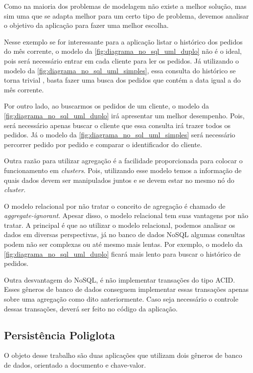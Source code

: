 Como na maioria dos problemas de modelagem não existe a melhor solução, mas sim uma que se adapta melhor para um certo tipo de problema, devemos analisar o objetivo da aplicação para fazer uma melhor escolha.

Nesse exemplo se for interessante para a aplicação listar o histórico dos pedidos do mês corrente, o modelo da \autoref{fig:diagrama_no_sql_uml_duplo} não é o ideal, pois será necessário entrar em cada cliente para ler os pedidos. Já utilizando o modelo da \autoref{fig:diagrama_no_sql_uml_simples}, essa consulta do histórico se torna trivial \cite{NoSQL}, basta fazer uma busca dos pedidos que contém a data igual a do mês corrente.

Por outro lado, ao buscarmos os pedidos de um cliente, o modelo da \autoref{fig:diagrama_no_sql_uml_duplo} irá apresentar um melhor desempenho. Pois, será necessário apenas buscar o cliente que essa consulta irá trazer todos os pedidos. Já o modelo da \autoref{fig:diagrama_no_sql_uml_simples} será necessário percorrer pedido por pedido e comparar o identificador do cliente.

Outra razão para utilizar agregação é a facilidade proporcionada para colocar o funcionamento em \textit{clusters}. Pois, utilizando esse modelo temos a informação de quais dados devem ser manipulados juntos e se devem estar no mesmo nó do \textit{cluster}.

O modelo relacional por não tratar o conceito de agregação é chamado de \textit{aggregate-ignorant}. Apesar disso, o modelo relacional tem suas vantagens por não tratar. A principal é que ao utilizar o modelo relacional, podemos analisar os dados em diversas perspectivas, já no banco de dados NoSQL algumas consultas podem não ser complexas ou até mesmo mais lentas. Por exemplo, o modelo da \autoref{fig:diagrama_no_sql_uml_duplo} ficará mais lento para buscar o histórico de pedidos.

Outra desvantagem do NoSQL, é não implementar transações do tipo \ac{ACID}. Esses gêneros de banco de dados conseguem implementar essas transações apenas sobre uma agregação como dito anteriormente. Caso seja necessário o controle dessas transações, deverá ser feito no código da aplicação.

\subsection{Persistência Poliglota}
\label{subsec:polyglotpersitence}

O objeto desse trabalho são duas aplicações que utilizam dois gêneros de banco de dados, orientado a documento e chave-valor.

